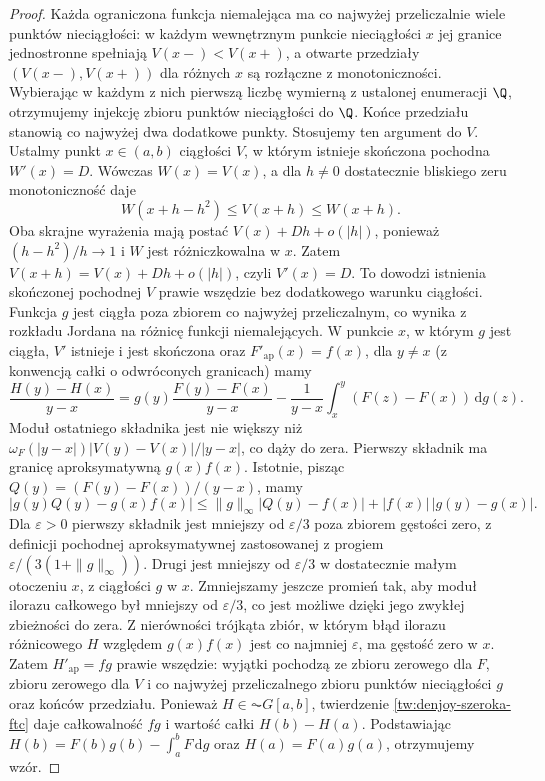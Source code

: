 \begin{proof}
Każda ograniczona funkcja niemalejąca ma co najwyżej
przeliczalnie wiele punktów nieciągłości: w każdym
wewnętrznym punkcie nieciągłości $x$ jej granice
jednostronne spełniają $V(x-)<V(x+)$, a otwarte
przedziały $(V(x-),V(x+))$ dla różnych $x$ są
rozłączne z monotoniczności. Wybierając w każdym
z nich pierwszą liczbę wymierną z ustalonej enumeracji
$\Q$, otrzymujemy injekcję zbioru punktów nieciągłości
do $\Q$. Końce przedziału stanowią co najwyżej dwa
dodatkowe punkty. Stosujemy ten argument do $V$.
Ustalmy punkt $x\in(a,b)$ ciągłości $V$, w którym
istnieje skończona pochodna $W'(x)=D$.
Wówczas $W(x)=V(x)$, a dla $h\ne0$ dostatecznie
bliskiego zeru monotoniczność daje
\[
 W(x+h-h^2)\le V(x+h)\le W(x+h).
\]
Oba skrajne wyrażenia mają postać $V(x)+Dh+o(|h|)$,
ponieważ $(h-h^2)/h\to1$ i $W$ jest różniczkowalna w $x$.
Zatem $V(x+h)=V(x)+Dh+o(|h|)$, czyli $V'(x)=D$.
To dowodzi istnienia skończonej pochodnej $V$
prawie wszędzie bez dodatkowego warunku ciągłości. Funkcja $g$ jest ciągła poza zbiorem co najwyżej przeliczalnym, co wynika z rozkładu Jordana na różnicę funkcji niemalejących. W punkcie $x$, w którym $g$ jest ciągła, $V'$ istnieje i jest skończona oraz $F'_{\mathrm{ap}}(x)=f(x)$, dla $y\ne x$ (z konwencją całki o odwróconych granicach) mamy
\[
 \frac{H(y)-H(x)}{y-x}
 =g(y)\frac{F(y)-F(x)}{y-x}
 -\frac{1}{y-x}\int_x^y(F(z)-F(x))\,\mathrm dg(z).
\]
Moduł ostatniego składnika jest nie większy niż $\omega_F(|y-x|)|V(y)-V(x)|/|y-x|$, co dąży do zera. Pierwszy składnik ma granicę aproksymatywną $g(x)f(x)$. Istotnie, pisząc $Q(y)=(F(y)-F(x))/(y-x)$, mamy
\[
 |g(y)Q(y)-g(x)f(x)|
 \le \|g\|_\infty|Q(y)-f(x)|+|f(x)|\,|g(y)-g(x)|.
\]
Dla $\varepsilon>0$ pierwszy składnik jest
mniejszy od $\varepsilon/3$ poza zbiorem gęstości zero,
z definicji pochodnej aproksymatywnej zastosowanej
z progiem $\varepsilon/(3(1+\|g\|_\infty))$.
Drugi jest mniejszy od $\varepsilon/3$ w dostatecznie
małym otoczeniu $x$, z ciągłości $g$ w $x$.
Zmniejszamy jeszcze promień tak, aby moduł ilorazu
całkowego był mniejszy od $\varepsilon/3$, co jest
możliwe dzięki jego zwykłej zbieżności do zera.
Z nierówności trójkąta zbiór, w którym błąd ilorazu
różnicowego $H$ względem $g(x)f(x)$ jest co najmniej
$\varepsilon$, ma gęstość zero w $x$. Zatem $H'_{\mathrm{ap}}=fg$ prawie wszędzie:
wyjątki pochodzą ze zbioru zerowego dla $F$, zbioru
zerowego dla $V$ i co najwyżej przeliczalnego zbioru
punktów nieciągłości $g$ oraz końców przedziału.
Ponieważ $H\in\AC G[a,b]$, twierdzenie
\ref{tw:denjoy-szeroka-ftc} daje całkowalność
$fg$ i wartość całki $H(b)-H(a)$.
Podstawiając $H(b)=F(b)g(b)-\int_a^bF\,\mathrm dg$
oraz $H(a)=F(a)g(a)$, otrzymujemy wzór.
\end{proof}

